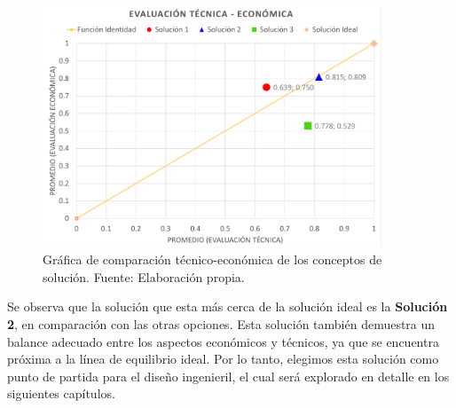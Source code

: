 \begin{figure}[H]
	\centering
	\includegraphics[width=0.9\textwidth]{img/comp_tecnico_economica.pdf}
	\caption[Gráfica de comparación técnico-económica de los conceptos de solución.]{Gráfica de comparación técnico-económica de los conceptos de solución. Fuente: Elaboración propia.}
	\label{fig:comp_tecnico_economica}
\end{figure}

Se observa que la solución que esta más cerca de la solución ideal es la \textbf{Solución 2}, en comparación con las otras opciones. Esta solución también demuestra un balance adecuado entre los aspectos económicos y técnicos, ya que se encuentra próxima a la línea de equilibrio ideal. Por lo tanto, elegimos esta solución como punto de partida para el diseño ingenieril, el cual será explorado en detalle en los siguientes capítulos.
